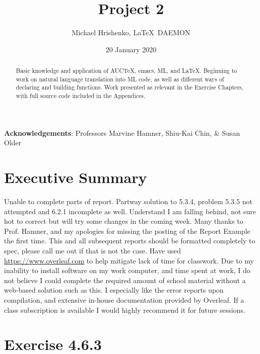 \documentclass[twoside]{report}
\title{Project 2}
\date{20 January 2020}
\author{Michael Hrishenko, \LaTeX\ DAEMON}
\begin{document}
\lstset{language=ML}
\maketitle
\begin{abstract}
    Basic knowledge and application of AUCTeX, emacs, ML, and \LaTeX{}. Beginning to work on natural language translation into ML code, as well as different ways of declaring and building functions. Work presented as relevant in the Exercise Chapters, with full source code included in the Appendices.
\end{abstract}

\textbf{Acknowledgements}: Professors Marvine Hamner, Shiu-Kai Chin, \& Susan Older

\tableofcontents

\chapter{Executive Summary}
\label{cha:executive-summary}
Unable to complete parts of report. Partway solution to 5.3.4, problem 5.3.5 not attempted and 6.2.1 incomplete as well. Understand I am falling behind, not sure hot to correct but will try some changes in the coming week. Many thanks to Prof. Hamner, and my apologies for missing the posting of the Report Example the first time. This and all subsequent reports should be formatted completely to spec, please call me out if that is not the case. Have used \url{https://www.overleaf.com} to help mitigate lack of time for classwork. Due to my inability to install software on my work computer, and time spent at work, I do not believe I could complete the required amount of school material without a web-based solution such as this. I especially like the error reports upon compilation, and extensive in-house documentation provided by Overleaf. If a class subscription is available I would highly recommend it for future sessions.

\chapter{Exercise 4.6.3}
\label{cha:4-6-3}
\end{document}
